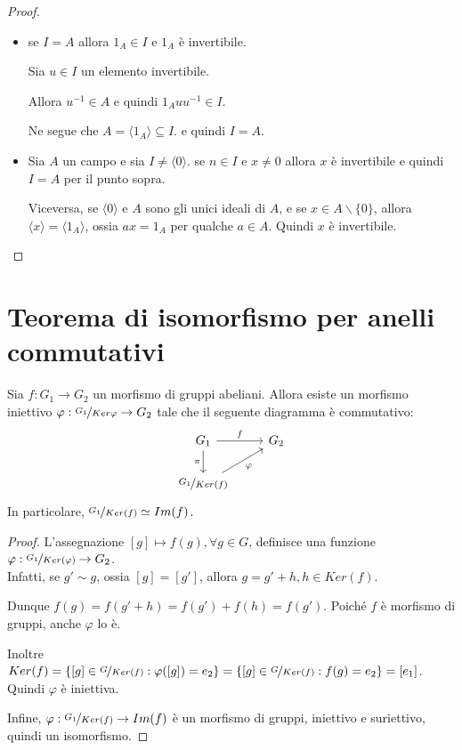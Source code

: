 \documentclass[10pt,a4paper,twoside]{book}
\begin{document}
\begin{proof}
    \
    \begin{itemize}
        \item se $I = A$ allora $1_A \in I$ e $1_A$ è invertibile.

              Sia $u \in I$ un elemento invertibile.

              Allora $u^{-1} \in A$ e quindi $1_A u u^{-1} \in I$.

              Ne segue che $A = \langle 1_A \rangle \subseteq I$. e quindi $I = A$.
        \item Sia $A$ un campo e sia $I \neq \langle 0 \rangle$. se $ n \in I$ e $x \neq 0$ allora $x$ è invertibile e quindi $I = A$
              per il punto sopra.

              Viceversa, se $\langle 0 \rangle$ e $A$ sono gli unici ideali di $A$,
              e se $x \in A  \backslash \{0\}$, allora $\langle x \rangle = \langle 1_A \rangle$, ossia $ax = 1_A$ per qualche $a \in A$. Quindi $x$ è invertibile.
    \end{itemize}
\end{proof}
\newpage


\section{Teorema di isomorfismo per anelli commutativi}

\begin{theorem}
    Sia $f: G_1 \rightarrow G_2$ un morfismo di gruppi abeliani. Allora esiste un morfismo iniettivo $\varphi : \nicefrac{G_1}{Ker \varphi} \rightarrow G_2$ tale che il seguente diagramma è commutativo:
    \begin{equation*}
        \begin{tikzcd}
            G_1 \arrow[r, "f"] \arrow[d, "\pi"'] & G_2 \\
            \nicefrac{G_1}{Ker(f)} \arrow[ru, "\varphi"']
        \end{tikzcd}
    \end{equation*}
    In particolare, $\nicefrac{G_1}{Ker(f)} \simeq Im(f)$.
\end{theorem}

\begin{proof}
    L'assegnazione $[g] \mapsto f(g), \forall g \in  G$, definisce una funzione $\varphi : \nicefrac{G_1}{Ker(\varphi)}
        \rightarrow G_2$.\\
    Infatti, se $g' \sim g$, ossia $[g]  = [g']$, allora $g = g' + h , h \in Ker(f)$.

    Dunque $f(g) = f(g' + h) = f(g') + f(h) = f(g')$. Poiché $f$ è morfismo di gruppi, anche $\varphi$ lo è.

    Inoltre $Ker(f) = \{[g] \in \nicefrac{G}{Ker(f)} : \varphi([g]) = e_2\}=\{[g] \in  \nicefrac{G}{Ker(f)} : f(g) = e_2\} = {[e_1]}$. Quindi $\varphi$ è iniettiva.

    Infine, $ \varphi : \nicefrac{G_1}{Ker(f)} \rightarrow Im(f)$ è un morfismo di gruppi, iniettivo e suriettivo, quindi un isomorfismo.
\end{proof}
\end{document}
